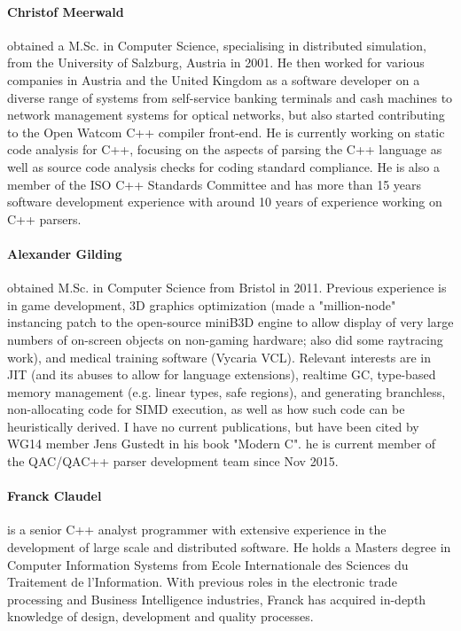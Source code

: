 \documentclass[a4paper,11pt]{article}
\begin{document}
\paragraph{Christof Meerwald}
obtained a M.Sc. in Computer Science, specialising in distributed simulation, from the University of Salzburg, Austria in 2001. He then worked for various companies in Austria and the United Kingdom as a software developer on a diverse range of systems from self-service banking terminals and cash machines to network management systems for optical networks, but also started contributing to the Open Watcom C++ compiler front-end.
He is currently working on static code analysis for C++, focusing on the aspects of parsing the C++ language as well as source code analysis checks for coding standard compliance. He is also a member of the ISO C++ Standards Committee and has more than 15 years software development experience with around 10 years of experience working on C++ parsers.

\paragraph{Alexander Gilding}
obtained M.Sc. in Computer Science from Bristol in 2011. Previous experience is in game development, 3D graphics optimization (made a "million-node" instancing patch to the open-source miniB3D engine to allow display of very large numbers of on-screen objects on non-gaming hardware; also did some raytracing work), and medical training software (Vycaria VCL).
Relevant interests are in JIT (and its abuses to allow for language extensions), realtime GC, type-based memory management (e.g. linear types, safe regions), and generating branchless, non-allocating code for SIMD execution, as well as how such code can be heuristically derived. I have no current publications, but have been cited by WG14 member Jens Gustedt in his book "Modern C".
he is current member of the QAC/QAC++ parser development team since Nov 2015.

\pagebreak
\paragraph{Franck Claudel}
is a senior C++ analyst programmer with extensive experience in the development of large scale and distributed software. He holds a Masters degree in Computer Information Systems from Ecole Internationale des Sciences du Traitement de l'Information. With previous roles in the electronic trade processing and Business Intelligence industries, Franck has acquired in-depth knowledge of design, development and quality processes.
\end{document}
